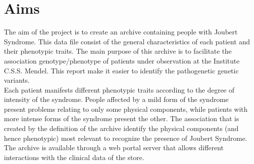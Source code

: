 \documentclass[a4paper]{report}
\begin{document}
\section{Aims}
The aim of the project is to create an archive containing people with Joubert Syndrome. This data file consist of the general characteristics of each patient and their phenotypic traits. The main purpose of this archive is to facilitate the association genotype/phenotype of patients under observation at the Institute C.S.S. Mendel. This report make it easier to identify the pathogenetic genetic variants.\\
Each patient manifests different phenotypic traits according to the degree of intensity of the syndrome. People affected by a mild form of the syndrome present problems relating to only some physical components, while patients with more intense forms of the syndrome present the other. The association that is created by the definition of the archive identify the physical components (and hence phenotypic) most relevant to recognize the presence of Joubert Syndrome. \\
The archive is available through a web portal server that allows different interactions with the clinical data of the store. 
\end{document}
